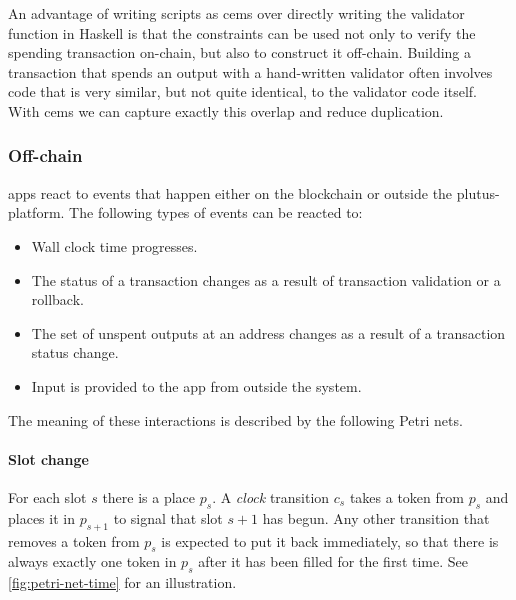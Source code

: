 An advantage of writing \glspl{script} as \glspl{cem} over directly writing the \gls{validator} function in Haskell is that the constraints can be used not only to verify the spending transaction on-chain, but also to construct it off-chain.
Building a transaction that spends an output with a hand-written \gls{validator} often involves code that is very similar, but not quite identical, to the validator code itself.
With \glspl{cem} we can capture exactly this overlap and reduce duplication.

\subsubsection{Off-chain}

\glspl{app} react to events that happen either on the blockchain or outside the \gls{plutus-platform}.
The following types of events can be reacted to:
\begin{itemize}
  \item Wall clock time progresses.
  \item The status of a transaction changes as a result of transaction validation or a rollback.
  \item The set of unspent outputs at an address changes as a result of a transaction status change.
  \item Input is provided to the \gls{app} from outside the system.
\end{itemize}

The meaning of these interactions is described by the following Petri nets.

\paragraph{Slot change}

For each slot $s$ there is a place $p_s$.
A \emph{clock} transition $c_s$ takes a token from $p_s$ and places it in $p_{s+1}$ to signal that slot $s + 1$ has begun.
Any other transition that removes a token from $p_s$ is expected to put it back immediately, so that there is always exactly one token in $p_s$ after it has been filled for the first time. See \ref{fig:petri-net-time} for an illustration.

